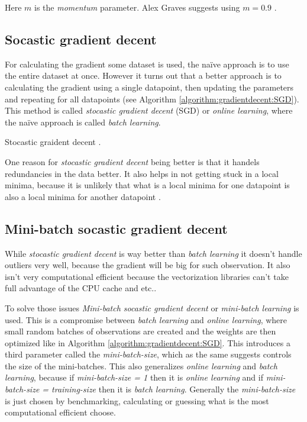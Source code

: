 Here $m$ is the \textit{momentum} parameter. Alex Graves suggests using $m = 0.9$ \cite{alexgraves}.

\subsection{Socastic gradient decent}

For calculating the gradient some dataset is used, the naïve approach is to use the entire dataset at once. However it turns out that a better approach is to calculating the gradient using a single datapoint, then updating the parameters and repeating for all datapoints (see Algorithm \ref{algorithm:gradientdecent:SGD}). This method is called \textit{stocastic gradient decent} (SGD) or \textit{online learning}, where the naïve approach is called \textit{batch learning}.

\begin{algorithm}[h]
 \DontPrintSemicolon
 \caption{Stocastic graident decent \cite{alexgraves}.}
 \label{algorithm:gradientdecent:SGD}
\end{algorithm}

One reason for \textit{stocastic gradient decent} being better is that it handels redundancies in the data better. It also helps in not getting stuck in a local minima, because it is unlikely that what is a local minima for one datapoint is also a local minima for another datapoint \cite{bishop}.

\subsection{Mini-batch socastic gradient decent}

While \textit{stocastic gradient decent} is way better than \textit{batch learning} it doesn't handle outliers very well, because the gradient will be big for such observation. It also isn't very computational efficient because the vectorization libraries can't take full advantage of the CPU cache and etc..

To solve those issues \textit{Mini-batch socastic gradient decent} or \textit{mini-batch learning} is used. This is a compromise between \textit{batch learning} and \textit{online learning}, where small random batches of observations are created and the weights are then optimized like in Algorithm \ref{algorithm:gradientdecent:SGD}. This introduces a third parameter called the \textit{mini-batch-size}, which as the same suggests controls the size of the mini-batches. This also generalizes \textit{online learning} and \textit{batch learning}, because if \textit{mini-batch-size = 1} then it is \textit{online learning} and if \textit{mini-batch-size = training-size} then it is \textit{batch learning}. Generally the \textit{mini-batch-size} is just chosen by benchmarking, calculating or guessing what is the most computational efficient choose.


